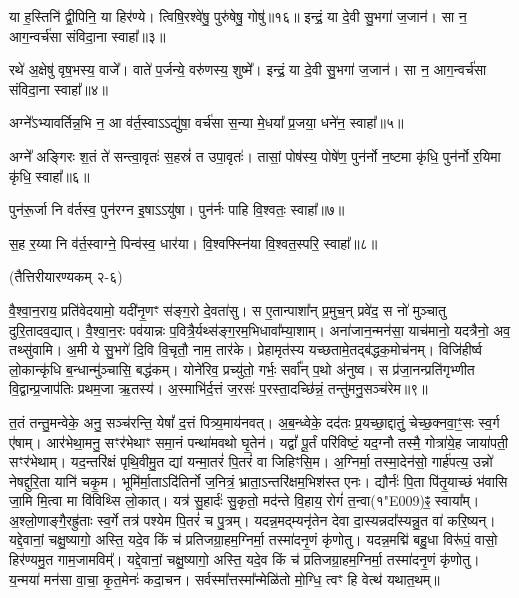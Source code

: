 या ह॒स्तिनि॑ द्वी॒पिनि॒ या हिर॑ण्ये।
त्विषि॒रश्वे॑षु॒ पुरु॑षेषु॒ गोषु॑॥१६॥
इन्द्रं॒ या दे॒वी सु॒भगा॑ ज॒जान॑।
सा न॒ आग॒न्वर्च॑सा संविदा॒ना स्वाहा᳚॥३॥




रथे॑ अ॒क्षेषु॑ वृष॒भस्य॒ वाजे᳚।
वाते॑ प॒र्जन्ये॒ वरु॑णस्य॒ शुष्मे᳚।
इन्द्रं॒ या दे॒वी सु॒भगा॑ ज॒जान॑।
सा न॒ आग॒न्वर्च॑सा संविदा॒ना स्वाहा᳚॥४॥



अग्ने᳚\-ऽभ्यावर्तिन्न॒भि न॒ आ व॑र्त॒स्वा\-ऽऽद्यु॑षा॒ वर्च॑सा स॒न्या मे॒धया᳚ प्र॒जया॒ धने॑न॒ स्वाहा᳚॥५॥


अग्ने᳚ अङ्गिरः श॒तं ते॑ सन्त्वा॒वृतः॑ स॒हस्रं॑ त उपा॒वृतः॑।
तासां॒ पोष॑स्य॒ पोषे॑ण॒ पुन॑र्नो न॒ष्टमा कृ॑धि॒ पुन॑र्नो र॒यिमा कृ॑धि॒ स्वाहा᳚॥६॥



पुन॑रू॒र्जा नि व॑र्तस्व॒ पुन॑रग्न इ॒षा\-ऽऽ\-यु॑षा। पुन॑र्नः पाहि वि॒श्वतः॒ स्वाहा᳚॥७॥



स॒ह र॒य्या नि व॑र्त॒स्वाग्ने॒ पिन्व॑स्व॒ धार॑या। वि॒श्वफ्स्नि॑या वि॒श्वत॒स्परि॒ स्वाहा᳚॥८॥




\centerline{\scriptsize (तैत्तिरीयारण्यकम् २-६)}


वै॒श्वा॒न॒राय॒ प्रति॑वेदयामो॒ यदी॑नृ॒णꣳ स॑ङ्ग॒रो दे॒वता॑सु। 
स ए॒तान्पाशा᳚न् प्र॒मुच॒न् प्रवे॑द॒ स नो॑ मुञ्चातु दुरि॒तादव॒द्यात्। 
वै॒श्वा॒न॒रः पव॑यान्नः प॒वित्रै॒र्यथ्स॑ङ्ग॒रम॒भिधावा᳚म्या॒शाम्। 
अना॑जान॒न्मन॑सा॒ याच॑मानो॒ यदत्रैनो॒ अव॒ तथ्सु॑वामि। 
अ॒मी ये सु॒भगे॑ दि॒वि वि॒चृतौ॒ नाम॒ तार॑के। 
प्रेहामृत॑स्य यच्छतामे॒तद्ब॑द्धक॒मोच॑नम्। 
विजि॑हीर्ष्व लो॒कान्कृ॑धि ब॒न्धान्मु॑ञ्चासि॒ बद्ध॑कम्। 
योने॑रिव॒ प्रच्यु॑तो॒ गर्भः॒ सर्वा᳚न् प॒थो अ॑नुष्व। 
स प्र॑जा॒नन्प्रति॑गृभ्णीत वि॒द्वान्प्र॒जाप॑तिः प्रथम॒जा ऋ॒तस्य॑। 
अ॒स्माभि॑र्द॒त्तं ज॒रसः॑ प॒रस्ता॒दच्छि॑न्नं॒ तन्तु॑मनु॒सञ्च॑रेम॥९॥

त॒तं तन्तु॒मन्वेके॒ अनु॒ सञ्च॑रन्ति॒ येषां᳚ द॒त्तं पित्र्य॒माय॑नवत्। 
अ॒ब॒न्ध्वेके॒ दद॑तः प्र॒यच्छा॒द्दातुं॒ चेच्छ॒क्नवा॒ꣳ॒सः स्व॒र्ग ए॑षाम्। 
आर॑भेथा॒मनु॒ सꣳर॑भेथाꣳ समा॒नं पन्था॑मवथो घृ॒तेन॑। 
यद्वां᳚ पू॒र्तं परि॑विष्टं॒ यद॒ग्नौ तस्मै॒ गोत्रा॑ये॒ह जाया॑पती॒ सꣳर॑भेथाम्। 
यद॒न्तरि॑क्षं पृथि॒वीमु॒त द्यां यन्मा॒तरं॑ पि॒तरं॑ वा जिहिꣳसि॒म। 
अ॒ग्निर्मा॒ तस्मा॒देन॑सो॒ गार्\mbox{}ह॑पत्य॒ उन्नो॑ नेषद्दुरि॒ता यानि॑ चकृ॒म। 
भूमि॑र्मा॒ताऽदि॑तिर्नो ज॒नित्रं॒ भ्राता॒ऽन्तरि॑क्षम॒भिश॑स्त एनः। 
द्यौर्नः॑ पि॒ता पि॑तृ॒याच्छं भ॑वासि जा॒मि मि॒त्वा मा वि॑विथ्सि लो॒कात्। 
यत्र॑ सु॒हार्दः॑ सु॒कृतो॒ मद॑न्ते वि॒हाय॒ रोगं॑ त॒न्वा(१\char"E009)ꣴ॒ स्वाया᳚म्। 
अ॒श्लो॒णाङ्गै॒रह्रु॑ताः स्व॒र्गे तत्र॑ पश्येम पि॒तरं॑ च पु॒त्रम्। 
यदन्न॒मद्म्यनृ॑तेन देवा दा॒स्यन्नदा᳚स्यन्नु॒त वा॑ करि॒ष्यन्। 
यद्दे॒वानां॒ चक्षु॒ष्यागो॒ अस्ति॒ यदे॒व किं च॑ प्रतिजग्रा॒हम॒ग्निर्मा॒ तस्मा॑दनृ॒णं कृ॑णोतु। 
यदन्न॒मद्मि॑ बहु॒धा विरू॑पं॒ वासो॒ हिर॑ण्यमु॒त गाम॒जामविम्᳚। 
यद्दे॒वानां॒ चक्षु॒ष्यागो॒ अस्ति॒ यदे॒व किं च॑ प्रतिजग्रा॒हम॒ग्निर्मा॒ तस्मा॑दनृ॒णं कृ॑णोतु। 
य॒न्मया॑ मन॑सा वा॒चा॒ कृ॒त॒मेनः॑ कदा॒चन। 
सर्वस्मा᳚त्तस्मा᳚न्मेळि॑तो मो॒ग्धि॒ त्वꣳ हि वेत्थ॑ यथात॒थम्॥


\hyperref[sec:start_Kushmanda]{\closesection}
